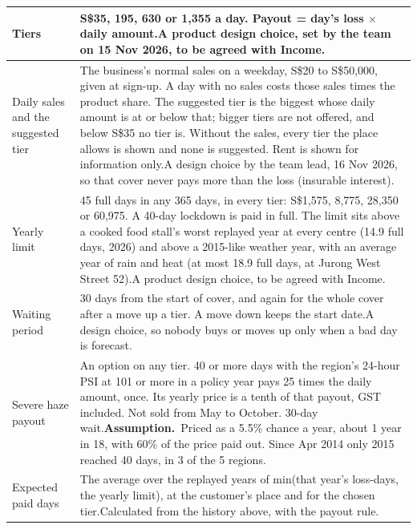 \documentclass[11pt,a4paper]{article}
\newcommand{\sgd}{\textup{S\$}}
\newcommand{\assumed}{\textcolor{assumed}{\textbf{Assumption.}}}
\begin{document}
{\small
\begin{xltabular}{\textwidth}{|K{3.4cm}|Y|}
\hline
Tiers & \sgd 35, 195, 630 or 1,355 a day. Payout = day's loss $\times$ daily amount.\newline A product design choice, set by the team on 15 Nov 2026, to be agreed with Income. \\
\hline
Daily sales and the suggested tier & The business's normal sales on a weekday, \sgd 20 to \sgd 50,000, given at sign-up. A day with no sales costs those sales times the product share. The suggested tier is the biggest whose daily amount is at or below that; bigger tiers are not offered, and below \sgd 35 no tier is. Without the sales, every tier the place allows is shown and none is suggested. Rent is shown for information only.\newline A design choice by the team lead, 16 Nov 2026, so that cover never pays more than the loss (insurable interest). \\
\hline
Yearly limit & 45 full days in any 365 days, in every tier: \sgd 1,575, 8,775, 28,350 or 60,975. A 40-day lockdown is paid in full. The limit sits above a cooked food stall's worst replayed year at every centre (14.9 full days, 2026) and above a 2015-like weather year, with an average year of rain and heat (at most 18.9 full days, at Jurong West Street 52).\newline A product design choice, to be agreed with Income. \\
\hline
Waiting period & 30 days from the start of cover, and again for the whole cover after a move up a tier. A move down keeps the start date.\newline A design choice, so nobody buys or moves up only when a bad day is forecast. \\
\hline
Severe haze payout & An option on any tier. 40 or more days with the region's 24-hour PSI at 101 or more in a policy year pays 25 times the daily amount, once. Its yearly price is a tenth of that payout, GST included. Not sold from May to October. 30-day wait.\newline \assumed\ Priced as a 5.5\% chance a year, about 1 year in 18, with 60\% of the price paid out. Since Apr 2014 only 2015 reached 40 days, in 3 of the 5 regions.\cite{team-data} \\
\hline
Expected paid days & The average over the replayed years of min(that year's loss-days, the yearly limit), at the customer's place and for the chosen tier.\newline Calculated from the history above, with the payout rule. \\

\end{xltabular}}
\end{document}
